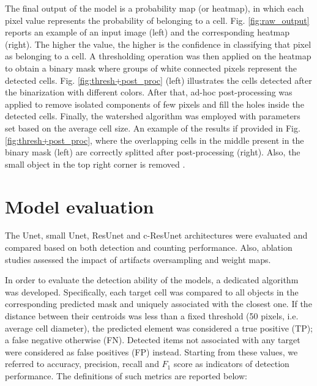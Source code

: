 The final output of the model is a probability map (or heatmap), in which each pixel value represents the probability of belonging to a cell. 
Fig. \ref{fig:raw_output} reports an example of an input image (left) and the corresponding heatmap (right).
The higher the value, the higher is the confidence in classifying that pixel as belonging to a cell. 
A thresholding operation was then applied on the heatmap to obtain a binary mask where groups of white connected pixels represent the detected cells. Fig. \ref{fig:thresh+post_proc} (left) illustrates the cells detected after the binarization with different colors.
After that, ad-hoc post-processing was applied to remove isolated components of few pixels and fill the holes inside the detected cells. 
Finally, the watershed algorithm \cite{watershed} was employed with parameters set based on the average cell size.
An example of the results if provided in Fig. \ref{fig:thresh+post_proc}, where the overlapping cells in the middle present in the binary mask (left) are correctly splitted after post-processing (right). Also, the small object in the top right corner is removed
.


\section{Model evaluation} \label{sec:model_evaluation}

The Unet, small Unet, ResUnet and c-ResUnet architectures were evaluated and compared based on both detection and counting performance. 
Also, ablation studies assessed the impact of artifacts oversampling and weight maps.

 In order to evaluate the detection ability of the models, a dedicated algorithm was developed.
Specifically, each target cell was compared to all objects in the corresponding predicted mask and uniquely associated with the closest one.
If the distance between their centroids was less than a fixed threshold (50 pixels, i.e. average cell diameter), the predicted element was considered a true positive (TP); a false negative otherwise (FN).
Detected items not associated with any target were considered as false positives (FP) instead.
Starting from these values, we referred to accuracy, precision, recall and $F_1$ score as indicators of detection performance.
The definitions of such metrics are reported below:

